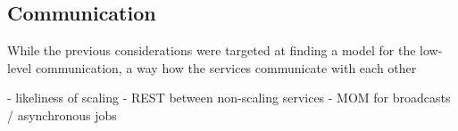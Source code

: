 \subsection{Communication} %
  \label{sub:application_level_communication}
  While the previous considerations were targeted at finding a model for the low-level communication, a way how the services communicate with each other

  - likeliness of scaling
  - REST between non-scaling services
  - MOM for broadcasts / asynchronous jobs






